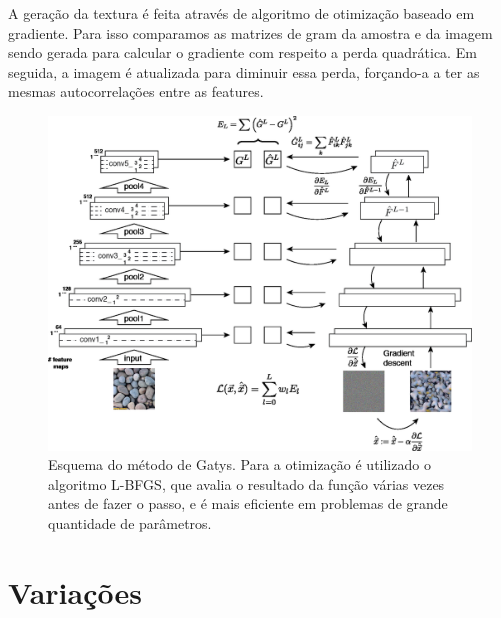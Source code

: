 A geração da textura é feita através de algoritmo
de otimização baseado em gradiente. Para isso
comparamos as matrizes de gram da amostra e da
imagem sendo gerada para calcular o gradiente
com respeito a perda quadrática. Em seguida,
a imagem é atualizada para diminuir essa perda,
forçando-a a ter as mesmas autocorrelações entre
as features.

\begin{figure}[!ht]
	\centering
	\includegraphics[width=\linewidth*2/3]{files/assets/articles/gatys2.png}
	\caption{Esquema do método de Gatys. Para a otimização
		é utilizado o algoritmo L-BFGS, 
		que avalia o resultado da função
		várias vezes antes de fazer o passo,
		e é mais eficiente em problemas de grande quantidade
		de parâmetros.}
	\label{img:preview}
\end{figure}


 






\iftrue
\chapter{Variações}


